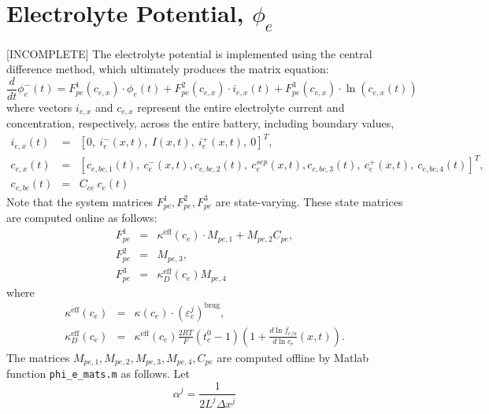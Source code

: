\documentclass[12pt]{article}
\newcommand{\eff}{\text{eff}}
\newcommand{\brug}{\text{brug}}
\newcommand{\red}[1]{{\color{red}#1}}
\begin{document}
\section{Electrolyte Potential, $\phi_{e}$}\label{sec:phie}
\red{[INCOMPLETE]} The electrolyte potential is implemented using the central difference method, which ultimately produces the matrix equation:
\begin{equation}
	\frac{d}{dt} \phi_{e}^{-}(t) = F^{1}_{pe}(c_{e,x}) \cdot \phi_{e}(t) + F^{2}_{pe}(c_{e,x}) \cdot i_{e,x}(t) + F^{3}_{pe}(c_{e,x}) \cdot \ln(c_{e,x}(t)) 
\end{equation}
where vectors $i_{e,x}$ and $c_{e,x}$ represent the entire electrolyte current and concentration, respectively, across the entire battery, including boundary values,
\begin{eqnarray}
	i_{e,x}(t) &=& \left[0, \ i_{e}^{-}(x,t), \ I(x,t), \ i_{e}^{+}(x,t), \ 0 \right]^{T}, \label{eqn:iex} \\
	c_{e,x}(t) &=& \left[c_{e,bc,1}(t), \ c_{e}^{-}(x,t), c_{e,bc,2}(t), \ c_{e}^{sep}(x,t), c_{e,bc,3}(t), \ c_{e}^{+}(x,t), \ c_{e,bc,4}(t) \right]^{T}, \label{eqn:cex} \\ 
	c_{e,bc}(t) &=& C_{ce} \ c_{e}(t) 
\end{eqnarray}
Note that the system matrices $F^{1}_{pe}, F^{2}_{pe}, F^{3}_{pe}$ are state-varying.  These state matrices are computed online as follows:
\begin{eqnarray}
	F^{1}_{pe} &=& \kappa^{\eff}(c_e) \cdot M_{pe,1} + M_{pe,2} C_{pe}, \\
	F^{2}_{pe} &=& M_{pe,3}, \\
	F^{3}_{pe} &=& \kappa^{\eff}_D(c_e) M_{pe,4}
\end{eqnarray}
where
\begin{eqnarray}
	\kappa^{\eff}(c_e) &=& \kappa(c_e) \cdot (\varepsilon_e^j)^{\brug}, \\
	\kappa^{\eff}_D(c_e) &=& \kappa^{\eff}(c_e) \frac{2RT}{F} (t_c^0 - 1) \left(1 + \frac{d \ln f_{c/a}}{d \ln c_{e}}(x,t) \right).
\end{eqnarray}
The matrices $M_{pe,1}, M_{pe,2}, M_{pe,3}, M_{pe,4}, C_{pe}$ are computed offline by Matlab function \texttt{phi\_e\_mats.m} as follows. Let
\begin{equation}
	\alpha^{j} = \frac{1}{2 L^{j} \Delta x^{j}}
\end{equation}


%
\end{document}
